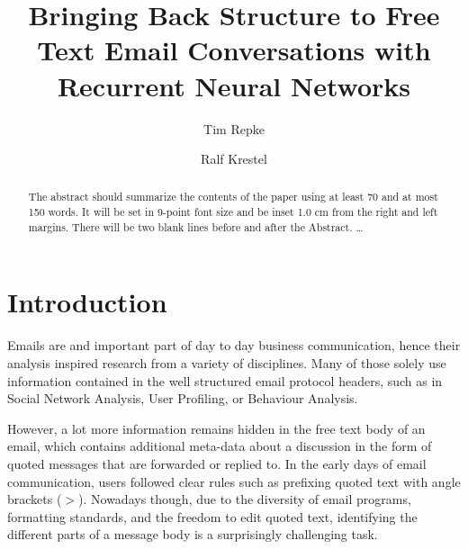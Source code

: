 \documentclass{llncs}
\begin{document}
%
\frontmatter          %
%
\pagestyle{headings}  %

\mainmatter              %
%
\title{Bringing Back Structure to Free Text Email Conversations with Recurrent Neural Networks}
%
%
\author{Tim Repke \and Ralf Krestel}
%
%
%

\maketitle              %

\begin{abstract}
The abstract should summarize the contents of the paper
using at least 70 and at most 150 words. It will be set in 9-point
font size and be inset 1.0 cm from the right and left margins.
There will be two blank lines before and after the Abstract. \dots
\end{abstract}
%
\section{Introduction}
Emails are and important part of day to day business communication, hence their analysis inspired research from a variety of disciplines.
Many of those solely use information contained in the well structured email protocol headers, such as in Social Network Analysis, User Profiling, or Behaviour Analysis.

However, a lot more information remains hidden in the free text body of an email, which contains additional meta-data about a discussion in the form of quoted messages that are forwarded or replied to.
In the early days of email communication, users followed clear rules such as prefixing quoted text with angle brackets ($>$).
Nowadays though, due to the diversity of email programs, formatting standards, and the freedom to edit quoted text, identifying the different parts of a message body is a surprisingly challenging task.
\end{document}
